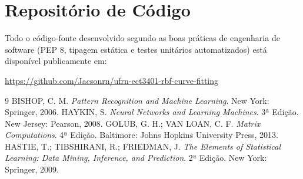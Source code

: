 \documentclass[12pt,a4paper]{article}
\begin{document}
\section{Repositório de Código}
Todo o código-fonte desenvolvido segundo as boas práticas de engenharia de software (PEP 8, tipagem estática e testes unitários automatizados) está disponível publicamente em:
\begin{center}
\url{https://github.com/Jacsonrn/ufrn-ect3401-rbf-curve-fitting}
\end{center}

\begin{thebibliography}{9}
 BISHOP, C. M. \textit{Pattern Recognition and Machine Learning}. New York: Springer, 2006.
 HAYKIN, S. \textit{Neural Networks and Learning Machines}. 3ª Edição. New Jersey: Pearson, 2008.
 GOLUB, G. H.; VAN LOAN, C. F. \textit{Matrix Computations}. 4ª Edição. Baltimore: Johns Hopkins University Press, 2013.
 HASTIE, T.; TIBSHIRANI, R.; FRIEDMAN, J. \textit{The Elements of Statistical Learning: Data Mining, Inference, and Prediction}. 2ª Edição. New York: Springer, 2009.
\end{thebibliography}
\end{document}
